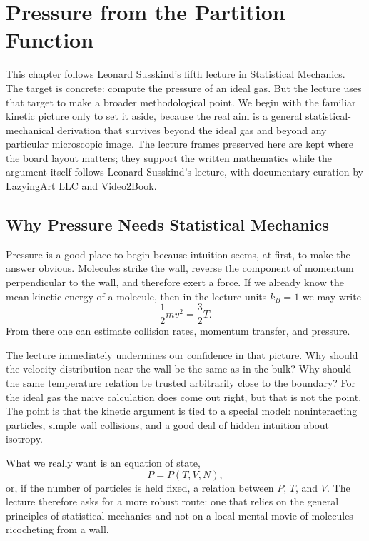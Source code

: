 \chapter{Pressure from the Partition Function}

This chapter follows Leonard Susskind's fifth lecture in Statistical Mechanics. The target is concrete: compute the pressure of an ideal gas. But the lecture uses that target to make a broader methodological point. We begin with the familiar kinetic picture only to set it aside, because the real aim is a general statistical-mechanical derivation that survives beyond the ideal gas and beyond any particular microscopic image. The lecture frames preserved here are kept where the board layout matters; they support the written mathematics while the argument itself follows Leonard Susskind's lecture, with documentary curation by LazyingArt LLC and Video2Book.

\section{Why Pressure Needs Statistical Mechanics}

Pressure is a good place to begin because intuition seems, at first, to make the answer obvious. Molecules strike the wall, reverse the component of momentum perpendicular to the wall, and therefore exert a force. If we already know the mean kinetic energy of a molecule, then in the lecture units \(k_B=1\) we may write
\begin{equation}
\frac{1}{2} m v^2 = \frac{3}{2} T.
\end{equation}
From there one can estimate collision rates, momentum transfer, and pressure.

The lecture immediately undermines our confidence in that picture. Why should the velocity distribution near the wall be the same as in the bulk? Why should the same temperature relation be trusted arbitrarily close to the boundary? For the ideal gas the naive calculation does come out right, but that is not the point. The point is that the kinetic argument is tied to a special model: noninteracting particles, simple wall collisions, and a good deal of hidden intuition about isotropy.

What we really want is an equation of state,
\begin{equation}
P = P(T,V,N),
\end{equation}
or, if the number of particles is held fixed, a relation between \(P\), \(T\), and \(V\). The lecture therefore asks for a more robust route: one that relies on the general principles of statistical mechanics and not on a local mental movie of molecules ricocheting from a wall.

